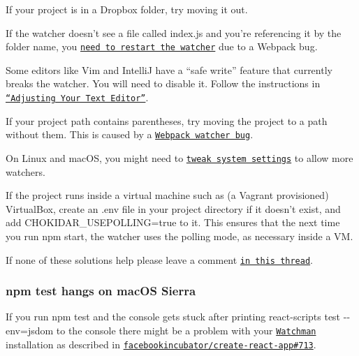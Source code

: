 \begin{DoxyItemize}
\item If your project is in a Dropbox folder, try moving it out.
\item If the watcher doesn’t see a file called {\ttfamily index.\+js} and you’re referencing it by the folder name, you \href{https://github.com/facebookincubator/create-react-app/issues/1164}{\tt need to restart the watcher} due to a Webpack bug.
\item Some editors like Vim and IntelliJ have a “safe write” feature that currently breaks the watcher. You will need to disable it. Follow the instructions in \href{https://webpack.js.org/guides/development/#adjusting-your-text-editor}{\tt “\+Adjusting Your Text Editor”}.
\item If your project path contains parentheses, try moving the project to a path without them. This is caused by a \href{https://github.com/webpack/watchpack/issues/42}{\tt Webpack watcher bug}.
\item On Linux and mac\+OS, you might need to \href{https://webpack.github.io/docs/troubleshooting.html#not-enough-watchers}{\tt tweak system settings} to allow more watchers.
\item If the project runs inside a virtual machine such as (a Vagrant provisioned) Virtual\+Box, create an {\ttfamily .env} file in your project directory if it doesn’t exist, and add {\ttfamily C\+H\+O\+K\+I\+D\+A\+R\+\_\+\+U\+S\+E\+P\+O\+L\+L\+I\+NG=true} to it. This ensures that the next time you run {\ttfamily npm start}, the watcher uses the polling mode, as necessary inside a VM.
\end{DoxyItemize}

If none of these solutions help please leave a comment \href{https://github.com/facebookincubator/create-react-app/issues/659}{\tt in this thread}.

\subsubsection*{{\ttfamily npm test} hangs on mac\+OS Sierra}

If you run {\ttfamily npm test} and the console gets stuck after printing {\ttfamily react-\/scripts test -\/-\/env=jsdom} to the console there might be a problem with your \href{https://facebook.github.io/watchman/}{\tt Watchman} installation as described in \href{https://github.com/facebookincubator/create-react-app/issues/713}{\tt facebookincubator/create-\/react-\/app\#713}.

